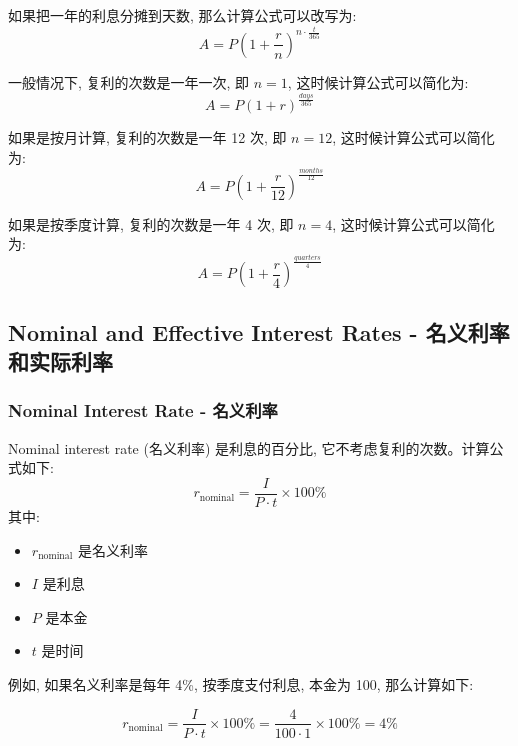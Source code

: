 如果把一年的利息分摊到天数, 那么计算公式可以改写为: 
\begin{equation}
    A = P \left(1 + \frac{r}{n}\right)^{n \cdot \frac{t}{365}}
\end{equation}

一般情况下, 复利的次数是一年一次, 即 $n = 1$, 这时候计算公式可以简化为: 
\begin{equation}
    A = P \left(1 + r\right)^{\frac{days}{365}}
\end{equation}

如果是按月计算, 复利的次数是一年 12 次, 即 $n = 12$, 这时候计算公式可以简化为: 
\begin{equation}
    A = P \left(1 + \frac{r}{12}\right)^{\frac{months}{12}}
\end{equation}

如果是按季度计算, 复利的次数是一年 4 次, 即 $n = 4$, 这时候计算公式可以简化为: 
\begin{equation}
    A = P \left(1 + \frac{r}{4}\right)^{\frac{quarters}{4}}
\end{equation}

\subsection{Nominal and Effective Interest Rates - 名义利率和实际利率}
\subsubsection{Nominal Interest Rate - 名义利率}
Nominal interest rate (名义利率) 是利息的百分比, 它不考虑复利的次数。计算公式如下: 
\begin{equation}
    r_{\text{nominal}} = \frac{I}{P \cdot t} \times 100\%
\end{equation}
其中: 
\begin{itemize}
    \item $r_{\text{nominal}}$ 是名义利率
    \item $I$ 是利息
    \item $P$ 是本金
    \item $t$ 是时间
\end{itemize}

例如, 如果名义利率是每年 4\%, 按季度支付利息, 本金为 100, 那么计算如下:

\begin{equation}
    r_{\text{nominal}} = \frac{I}{P \cdot t} \times 100\% = \frac{4}{100 \cdot 1} \times 100\% = 4\%
\end{equation}

